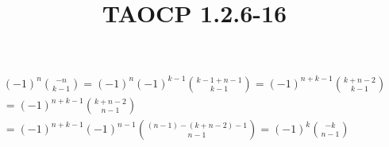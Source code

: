 \documentclass{article}
\title{TAOCP 1.2.6\mbox{-}16}
\begin{document}
\maketitle

\begin{multline*}
{(-1)}^{n} \binom{-n}{k-1} = {(-1)}^{n} {(-1)}^{k-1} \binom{k-1+n-1}{k-1} = {(-1)}^{n+k-1} \binom{k+n-2}{k-1} \\
= {(-1)}^{n+k-1} \binom{k+n-2}{n-1} \\
= {(-1)}^{n+k-1} {(-1)}^{n-1} \binom{(n-1)-(k+n-2)-1}{n-1} = {(-1)}^{k} \binom{-k}{n-1}
\end{multline*}
\end{document}
